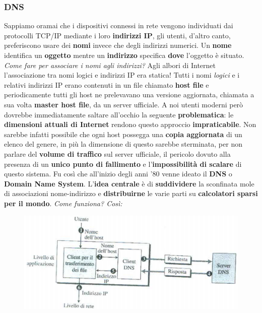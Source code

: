 \documentclass[11pt,a4paper]{article}
\theoremstyle{definition}
\begin{document}
\subsubsection{DNS}
Sappiamo oramai che i dispositivi connessi in rete vengono individuati dai protocolli TCP/IP mediante i loro \textbf{indirizzi IP}, gli utenti, d'altro canto, preferiscono usare dei \textbf{nomi} invece che degli indirizzi numerici. Un \textbf{nome} identifica un \textbf{oggetto} mentre un \textbf{indirizzo} specifica \textbf{dove} l'oggetto è situato.\newline\newline
\textit{Come fare per associare i nomi agli indirizzi?}\newline\newline
Agli albori di Internet l’associazione tra nomi logici e indirizzi IP era statica!
Tutti i nomi \textit{logici} e i relativi indirizzi IP erano contenuti in un file chiamato \textbf{host file} e periodicamente tutti gli host ne prelevavano una versione aggiornata, chiamata a sua volta \textbf{master host file}, da un server ufficiale.\newline
A noi utenti moderni però dovrebbe immediatamente saltare all'occhio la seguente \textbf{problematica}: le \textbf{dimensioni attuali di Internet} rendono questo approccio \textbf{impraticabile}. Non sarebbe infatti possibile che ogni host possegga una \textbf{copia aggiornata} di un elenco del genere, in più la dimensione di questo  sarebbe sterminata, per non parlare del \textbf{volume di traffico} sul server ufficiale, il pericolo dovuto alla presenza di un \textbf{unico punto di fallimento} e l'\textbf{impossibilità di scalare} di questo sistema.\newline
Fu così che all'inizio degli anni '80 venne ideato il \textbf{DNS} o \textbf{Domain Name System}. L'\textbf{idea centrale} è di \textbf{suddividere} la sconfinata mole di associazioni nome-indirizzo e \textbf{distribuirne} le varie parti su \textbf{calcolatori sparsi per il mondo}. \textit{Come funziona? Così:}
\begin{figure}[!h]
	\includegraphics[scale=0.8]{Immagini/DNS.png}
	\centering
\end{figure}\newline
\end{document}
